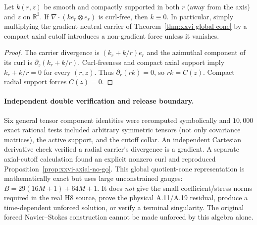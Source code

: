 \begin{proposition}
\label{prop:xxvi-axial-no-go}
Let $k(r,z)$ be smooth and compactly supported in both $r$
(away from the axis) and $z$ on $\mathbb R^3$.
If $\nabla\cdot(k e_r\otimes e_r)$ is curl-free, then
$k\equiv0$. In particular, simply multiplying the gradient-neutral
carrier of Theorem~\ref{thm:xxvi-global-cone} by a compact axial
cutoff introduces a non-gradient force unless it vanishes.
\end{proposition}
\begin{proof}
The carrier divergence is $(k_r+k/r)e_r$ and the
azimuthal component of its curl is
$\partial_z(k_r+k/r)$.
Curl-freeness and compact axial support imply
$k_r+k/r=0$ for every $(r,z)$.
Thus $\partial_r(rk)=0$, so $rk=C(z)$.
Compact radial support forces $C(z)=0$.
\end{proof}

\paragraph{Independent double verification and release boundary.}
Six general tensor component identities were recomputed symbolically
and $10{,}000$ exact rational tests included arbitrary symmetric
tensors (not only covariance matrices), the active support,
and the cutoff collar. An independent Cartesian derivative check
verified a radial carrier's divergence is a gradient. A separate
axial-cutoff calculation found an explicit nonzero curl and
reproduced Proposition~\ref{prop:xxvi-axial-no-go}.
This global quotient-cone representation is mathematically exact
but uses large unconstrained gauges: $B=29(16M+1)+64M+1$.
It does \emph{not} give the small coefficient/stress norms required
in the real H8 source, prove the physical A.11/A.19 residual,
produce a time-dependent unforced solution, or verify a terminal
singularity. The original forced Navier--Stokes construction
cannot be made unforced by this algebra alone.


